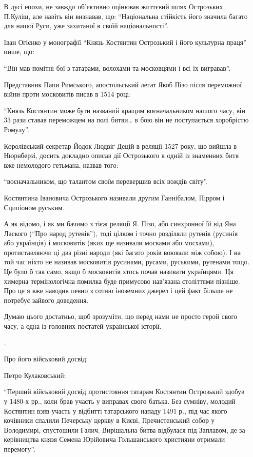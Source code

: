 В дусі епохи, не завжди об’єктивно оцінював життєвий шлях Острозьких П.Куліш,
але навіть він визнавав, що: \enquote{Національна стійкість його значила багато для
нашої Руси, уже захитаної в своїй національності}.

Іван Огієнко у монографії \enquote{Князь Костянтин Острозький і його культурна праця}
пише, що: 

\enquote{Він мав помітні бої з татарами, волохами та московцями і всі їх вигравав}.

Представник Папи Римського, апостольський легат Якоб Пізо після переможної
війни проти московитів писав в 1514 році: 

\enquote{Князь Костянтин може бути названий кращим воєначальником нашого часу, він 33
рази ставав переможцем на полі битви… в бою він не поступається хоробрістю
Ромулу}. 

Королівський секретар Йодок Людвіг Децій в реляції 1527 року, що вийшла в
Нюрнберзі, досить докладно описав дії Острозького в одній із знаменних битв вже
немолодого гетьмана, назвав того:

\enquote{воєначальником, що талантом своїм перевершив всіх вождів світу}.

Костянтина Івановича Острозького називали другим Ганнібалом, Пірром і Сципіоном
руським. 

А як відомо, і як ми бачимо з тієж реляції Я. Пізо, або синхронної їй від Яна
Лаского (\enquote{Про народ рутенів}), тоді цілком і точно розділяли рутенів (русинів
або українців) і московитів (яких ще називали москами або мосхами),
протиставляючи ці два різні народи (які багато років воювали між собою). І на
той час ніхто не називав московитів русинами, русами, руськими, рутенами тощо.
Це було б так само, якщо б московитів хтось почав називати українцями. Ця
химерна термінологічна помилка буде примусово нав’язана століттями пізніше. Про
це я вже наводив певно з сотню іноземних джерел і цей факт більше не потребує
зайвого доведення.

Думаю цього достатньо, щоб зрозуміти, що перед нами не просто герой свого часу,
а одна із головних постатей української історії.

.

Про його військовий досвід:

Петро Кулаковський:

\enquote{Перший військовий досвід протистояння татарам Костянтин Острозький здобув у
1480-х рр., коли брав участь у виправах свого батька. Без сумніву, молодий
Костянтин взяв участь у відбитті татарського нападу 1491 р., під час якого
кочівники спалили Печерську церкву в Києві, Пречистенський собор у Володимирі,
спустошили Галич. Вирішальна битва відбулася під Заплавом, де за керівництва
князя Семена Юрійовича Гольшанського християни отримали перемогу}.

